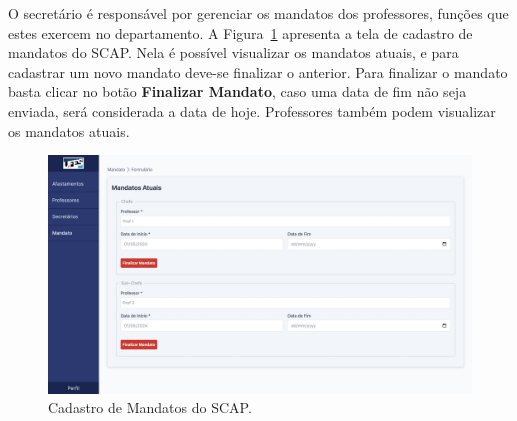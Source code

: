 O secretário é responsável por gerenciar os mandatos dos professores, funções que estes exercem
no departamento. A Figura~\ref{fig-mandato} apresenta a tela de cadastro de mandatos do SCAP.
Nela é possível visualizar os mandatos atuais, e para cadastrar um novo mandato deve-se finalizar o anterior.
Para finalizar o mandato basta clicar no botão \textbf{Finalizar Mandato}, caso uma data de fim não seja enviada,
será considerada a data de hoje. Professores também podem visualizar os mandatos atuais. 

\begin{figure}[h!]
    \centering
    \includegraphics[width=\textwidth]{figuras/prints-app/fig-mandato-visao-secretario.png}
    \caption{Cadastro de Mandatos do SCAP.}
    \label{fig-mandato}
\end{figure}